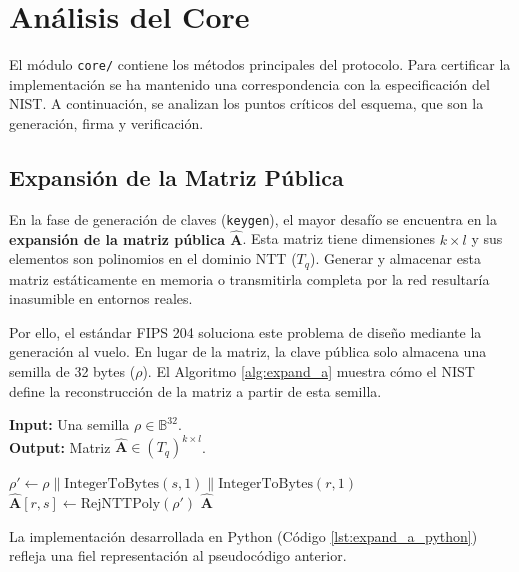 \documentclass[11pt, a4paper]{report}
\theoremstyle{definition}
\begin{document}
\section{Análisis del Core}
\label{sec:analisis_core}

El módulo \texttt{core/} contiene los métodos principales del protocolo. Para certificar la implementación se ha mantenido una correspondencia con la especificación del NIST. A continuación, se analizan los puntos críticos del esquema, que son la generación, firma y verificación.

\subsection{Expansión de la Matriz Pública}

En la fase de generación de claves (\texttt{keygen}), el mayor desafío se encuentra en la \textbf{expansión de la matriz pública $\mathbf{\hat{A}}$}. Esta matriz tiene dimensiones $k \times l$ y sus elementos son polinomios en el dominio NTT ($T_q$). Generar y almacenar esta matriz estáticamente en memoria o transmitirla completa por la red resultaría inasumible en entornos reales.

Por ello, el estándar FIPS 204 soluciona este problema de diseño mediante la generación al vuelo. En lugar de la matriz, la clave pública solo almacena una semilla de 32 bytes ($\rho$). El Algoritmo \ref{alg:expand_a} muestra cómo el NIST define la reconstrucción de la matriz a partir de esta semilla.

\begin{algorithm}[H]
\caption{\texttt{ExpandA}($\rho$) - Algoritmo 32 del estándar FIPS 204}
\label{alg:expand_a}
\textbf{Input:} Una semilla $\rho \in \mathbb{B}^{32}$. \\
\textbf{Output:} Matriz $\mathbf{\hat{A}} \in (T_q)^{k \times l}$.
\begin{algorithmic}[1]
        \STATE $\rho' \gets \rho \parallel \text{IntegerToBytes}(s, 1) \parallel \text{IntegerToBytes}(r, 1)$
        \STATE $\mathbf{\hat{A}}[r, s] \gets \text{RejNTTPoly}(\rho')$ 
    \ENDFOR
\ENDFOR
\RETURN $\mathbf{\hat{A}}$
\end{algorithmic}
\end{algorithm}

La implementación desarrollada en Python (Código \ref{lst:expand_a_python}) refleja una fiel representación al pseudocódigo anterior.
\vspace{0.3cm}
\end{document}
